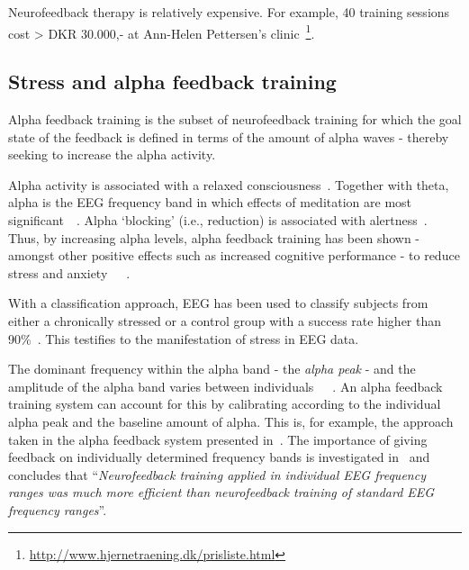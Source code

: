 \documentclass[a4paper,10pt,english,lof,lot,twoside]{puthesis}
\begin{document}
Neurofeedback therapy is relatively expensive. For example, 40 training sessions
cost \textgreater{} DKR 30.000,- at Ann-Helen Pettersen's clinic \footnote{
\href{http://www.hjernetraening.dk/prisliste.html}{http://www.hjernetraening.dk/prisliste.html}
}.


\subsection{Stress and alpha feedback training}
\label{ch-background/index:sec-background-stress-alpha-feedback-training}\label{ch-background/index:stress-and-alpha-feedback-training}
Alpha feedback training is the subset of neurofeedback training for
which the goal state of the feedback is defined in terms of the amount
of alpha waves - thereby seeking to increase the alpha activity.

Alpha activity is associated with a relaxed consciousness \cite{angelakis_eeg_2007}. Together with theta, alpha is the EEG
frequency band in which effects of meditation are most significant \cite{aftanas_changes_2003} \cite{brandmeyer_meditation_2013}. Alpha `blocking' (i.e.,
reduction) is associated with alertness \cite{angelakis_eeg_2007}. Thus, by increasing alpha levels, alpha
feedback training has been shown - amongst other positive effects such
as increased cognitive performance - to reduce stress and anxiety \cite{zoefel_neurofeedback_2011} \cite{angelakis_eeg_2007} \cite{white_alphatheta_2009}.

With a classification approach, EEG has been used to classify subjects
from either a chronically stressed or a control group with a success
rate higher than 90\% \cite{khosrowabadi_brain-computer_2011}. This
testifies to the manifestation of stress in EEG data.

The dominant frequency within the alpha band - the \emph{alpha peak} - and the
amplitude of the alpha band varies between individuals \cite{bazanova_comments_2012} \cite{angelakis_eeg_2007} \cite{zoefel_neurofeedback_2011}. An alpha feedback training
system can account for this by calibrating according
to the individual alpha peak and the baseline amount of alpha. This is,
for example, the approach taken in the alpha feedback system presented in \cite{stopczynski_smartphones_2013}. The importance of giving
feedback on individually determined frequency bands is investigated in \cite{bazanova_comments_2012}
and concludes that
``\emph{Neurofeedback training
applied in individual EEG frequency ranges was much
more efficient than neurofeedback training of standard
EEG frequency ranges}''.
\end{document}
